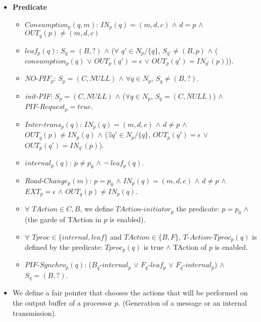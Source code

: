 \documentclass{llncs}
\begin{document}
\begin{itemize}
    \item{\textbf{Predicate}}
             \begin{itemize}
              \item{\textit{$Consumption_{p}(q,m)$}: $IN_{p}(q)=(m,d,c)$ $\wedge$ $d=p$ $\wedge$ $OUT_{q}(p) \ne (m,d,c)$}
               \item{$leaf_{p}(q)$: $S_{q}=(B,?)$ $\wedge$ ($\forall$ $q' \in N_{p} /\{q\}$, $S_{q'}\ne(B,p)$ $\wedge$ ($consumption_{p}(q)$ $\vee$ $OUT_{p}(q')=\epsilon$ $\vee$ $OUT_{p}(q')=IN_{q'}(p)$)).}
              \item{\textit{$NO\mbox{-}PIF_{p}$}: $S_{p}=(C,NULL)$ $\wedge$ $\forall q \in N_{p}$,  $S_{q} \ne (B,?)$.}
              \item{\textit{init-PIF}: $S_{p}=(C,NULL)$ $\wedge$ ($\forall q \in N_{p}$, $S_{q}=(C,NULL)$) $\wedge$
\newline \noindent $ PIF\mbox{-}Request_{p}=true$.}
               \item{\textit{$Inter\mbox{-}trans_{p}(q)$}: $IN_{p}(q)=(m,d,c)$  $\wedge$ $d\ne p$ $\wedge$ $OUT_{q}(p) \ne IN_{p}(q)$ $\wedge$ ($\exists q' \in N_{p}/\{q\}$, $OUT_{p}(q')=\epsilon$ $\vee$ $OUT_{p}(q')=IN_{q'}(p)$).}
\item{$internal_{p}(q)$: $p \ne p_0$ $\wedge$ $\neg$ $leaf_{p}(q)$.} 
              \item{$Road\mbox{-}Change_{p}(m)$: $p=p_0$ $\wedge$ $IN_{p}(q)=(m,d,c)$ $\wedge$ $d \ne p$ $\wedge$ $EXT_{p}=\epsilon$ $\wedge$ $OUT_{q}(p)\ne IN_{p}(q)$.}
               \item{$\forall$ $TAction \in {C,B}$, we define $TAction\mbox{-}initiator_{p}$ the predicate: $p=p_0$ $\wedge$ (the garde of TAction in $p$ is enabled).}
               \item{$\forall$ $Tproc \in \{internal,leaf\}$ and $TAction \in \{B,F\}$, $T\mbox{-}Action\mbox{-}Tproc_{p}(q)$ is defined by the predicate: $Tproc_{p}(q)$ is true $\wedge$ TAction of $p$ is enabled.}
\item{$PIF\mbox{-}Synchro_{p}(q)$:  ($B_{q}\mbox{-}internal_{p}$ $\vee$ $F_{q}\mbox{-}leaf_{p}$ $\vee$ $F_{q}\mbox{-}internal_{p}$) $\wedge$ $S_{q}=(B,?)$.\\}
               \end{itemize}
               
\item{We define a fair pointer that chooses the actions that will be performed on the output buffer of a processor $p$. (Generation of a message or an internal transmission). }


\end{itemize}
\end{document}
